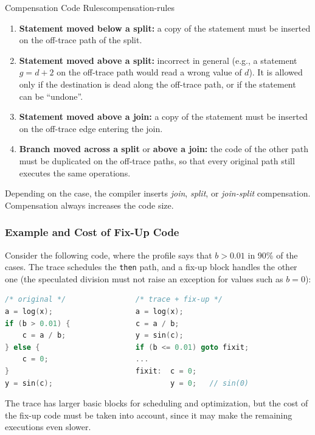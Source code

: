 \begin{concept}{Compensation Code Rules}{compensation-rules}
    \begin{enumerate}
        \item \textbf{Statement moved below a split:} a copy of the statement must be inserted on the off-trace path of the split.
        \item \textbf{Statement moved above a split:} incorrect in general (e.g., a statement $g=d+2$ on the off-trace path would read a wrong value of $d$). It is allowed only if the destination is dead along the off-trace path, or if the statement can be ``undone''.
        \item \textbf{Statement moved above a join:} a copy of the statement must be inserted on the off-trace edge entering the join.
        \item \textbf{Branch moved across a split} or \textbf{above a join:} the code of the other path must be duplicated on the off-trace paths, so that every original path still executes the same operations.
    \end{enumerate}
    Depending on the case, the compiler inserts \emph{join}, \emph{split}, or \emph{join-split} compensation. Compensation always increases the code size.
\end{concept}

\subsubsection{Example and Cost of Fix-Up Code}
Consider the following code, where the profile says that $b > 0.01$ in 90\% of the cases. The trace schedules the \texttt{then} path, and a fix-up block handles the other one (the speculated division must not raise an exception for values such as $b=0$):

\begin{lstlisting}[language=C, caption={Trace scheduling example: original code (left) and trace with fix-up block (right)}]
/* original */                /* trace + fix-up */
a = log(x);                   a = log(x);
if (b > 0.01) {               c = a / b;
    c = a / b;                y = sin(c);
} else {                      if (b <= 0.01) goto fixit;
    c = 0;                    ...
}                             fixit:  c = 0;
y = sin(c);                           y = 0;   // sin(0)
\end{lstlisting}

The trace has larger basic blocks for scheduling and optimization, but the cost of the fix-up code must be taken into account, since it may make the remaining executions even slower.

